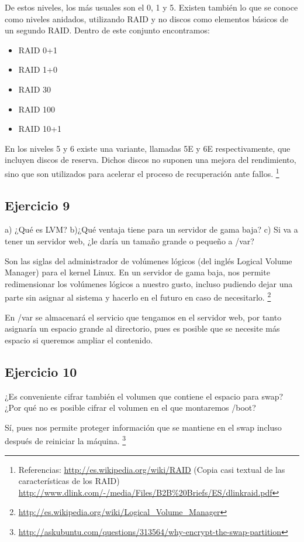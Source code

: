 \documentclass[a4paper, 11pt]{article} %
\begin{document}
De estos niveles, los más usuales son el 0, 1 y 5.
Existen también lo que se conoce como niveles anidados, utilizando RAID y no discos como elementos básicos de un segundo RAID. Dentro de este conjunto encontramos: 
\begin{itemize}
\item RAID 0+1
\item RAID 1+0
\item RAID 30
\item RAID 100
\item RAID 10+1
\end{itemize}

En los niveles 5 y 6 existe una variante, llamadas 5E y 6E respectivamente, que incluyen discos de reserva. Dichos discos no suponen una mejora del rendimiento, sino que son utilizados para acelerar el proceso de recuperación ante fallos. 
\footnote{Referencias: \url{http://es.wikipedia.org/wiki/RAID} (Copia casi textual de las características de los RAID) \\ \url{http://www.dlink.com/-/media/Files/B2B\%20Briefs/ES/dlinkraid.pdf}}


\subsection*{Ejercicio 9}
a) ¿Qué es LVM? b)¿Qué ventaja tiene para un servidor de gama baja? c)
Si va a tener un servidor web, ¿le daría un tamaño grande o pequeño a /var?

Son las siglas del administrador de volúmenes lógicos (del inglés Logical Volume Manager) para el kernel Linux. 
En un servidor de gama baja, nos permite redimensionar los volúmenes lógicos a nuestro gusto, incluso pudiendo dejar una parte sin asignar al sistema y hacerlo en el futuro en caso de necesitarlo. 
\footnote{\url{http://es.wikipedia.org/wiki/Logical_Volume_Manager}}

En /var se almacenará el servicio que tengamos en el servidor web, por tanto asignaría un espacio grande al directorio, pues es posible que se necesite más espacio si queremos ampliar el contenido. 


\subsection*{Ejercicio 10}
¿Es conveniente cifrar también el volumen que contiene el espacio para
swap? ¿Por qué no es posible cifrar el volumen en el que montaremos /boot?

Sí, pues nos permite proteger información que se mantiene en el swap incluso después de reiniciar la máquina. 
\footnote{\url{http://askubuntu.com/questions/313564/why-encrypt-the-swap-partition}}
\end{document}
